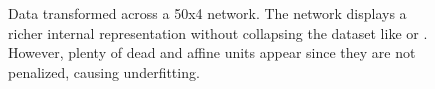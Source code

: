 \begin{figure}[h!]
{{    }
  }
  \caption{Data transformed across a 50x4 \SepPoint network. The network displays a richer internal representation without collapsing the dataset like \SepUnit or \ReLUBN. However, plenty of dead and affine units appear since they are not penalized, causing underfitting.}
    \label{fig:moonsPointwise}
\end{figure}


\begin{figure}[h!]
  \centering
   \parbox{\textwidth}{
    \parbox{.195\textwidth}{%
    }
    \parbox{.195\textwidth}{%
}}
\end{figure}
